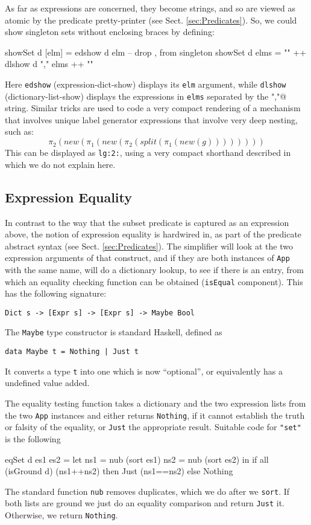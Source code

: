 As far as expressions are concerned,
they become strings, and so are viewed as atomic
by the predicate pretty-printer (see Sect. \ref{sec:Predicates}).
So, we could show singleton sets without enclosing braces
by defining:
\begin{code}
showSet d [elm] = edshow d elm   -- drop {,} from singleton
showSet d elms = "{" ++ dlshow d "," elms ++ "}"
\end{code}
Here \texttt{edshow} (expression-dict-show)
displays its \texttt{elm} argument,
while \texttt{dlshow} (dictionary-list-show) displays the expressions
in \texttt{elms} separated by the \verb@","@ string.
Similar tricks are used to code a very compact rendering
of a mechanism that involves unique label generator expressions
that involve very deep nesting, such as:
\[
 \pi_2(new(\pi_1(new(\pi_2(split(\pi_1(new(g))))))))
\]
This can be displayed as \texttt{lg:2:},
using a very compact shorthand described in \cite{conf/tase/BMN16}
which we do not explain here.


\subsection{Expression Equality}

In contrast to the way that the subset predicate
is captured as an expression above,
the notion of expression equality is hardwired in,
as part of the predicate abstract syntax (see Sect. \ref{sec:Predicates}).
The simplifier will look at the two expression
arguments of that construct,
and if they are both instances of \texttt{App} with the same name,
will do a dictionary lookup, to see if there
is an entry, from
which an equality checking function can be obtained (\texttt{isEqual} component).
This has the following signature:
\begin{verbatim}
Dict s -> [Expr s] -> [Expr s] -> Maybe Bool
\end{verbatim}
The \texttt{Maybe} type constructor is standard Haskell, defined as
\begin{verbatim}
data Maybe t = Nothing | Just t
\end{verbatim}
It converts a type \texttt{t} into one which is now ``optional'',
or equivalently has a undefined value added.

The equality testing function takes a dictionary and the two expression
lists from the two \texttt{App} instances
and either returns \texttt{Nothing},
if it cannot establish the truth or falsity of the equality,
or \texttt{Just} the appropriate result.
Suitable code for \verb$"set"$ is the following
\begin{code}
eqSet d es1 es2
 = let ns1 = nub (sort es1)
       ns2 = nub (sort es2)
   in if all (isGround d) (ns1++ns2)
      then Just (ns1==ns2) else Nothing
\end{code}
The standard function \texttt{nub} removes duplicates,
which we do after we \texttt{sort}.
If both lists are ground we just do an equality comparison
and return \texttt{Just} it. Otherwise, we return \texttt{Nothing}.




